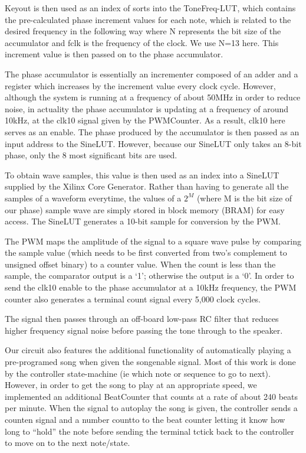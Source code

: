 \documentclass{article}
\begin{document}
    Key\textunderscore out is then used as an index of sorts into the ToneFreq-LUT, which contains the pre-calculated phase increment values for each note, which is related to the desired frequency in the following way
    where N represents the bit size of the accumulator and fclk is the frequency of the clock. We use N=13 here. This increment value is then passed on to the phase accumulator.

    The phase accumulator is essentially an incrementer composed of an adder and a register which increases by the increment value every clock cycle. However, although the system is running at a frequency of about 50MHz in order to reduce noise, in actuality the phase accumulator is updating at a frequency of around 10kHz, at the clk10 signal given by the PWMCounter. As a result, clk10 here serves as an enable. The phase produced by the accumulator is then passed as an input address to the SineLUT. However, because our SineLUT only takes an 8-bit phase, only the 8 most significant bits are used.

    To obtain wave samples, this value is then used as an index into a SineLUT supplied by the Xilinx Core Generator. Rather than having to generate all the samples of a waveform everytime, the values of a $2^M$ (where M is the bit size of our phase) sample wave are simply stored in block memory (BRAM) for easy access. The SineLUT generates a 10-bit sample for conversion by the PWM.

    The PWM maps the amplitude of the signal to a square wave pulse by comparing the sample value (which needs to be first converted from two's complement to unsigned offset binary) to a counter value. When the count is less than the sample, the comparator output is a `1'; otherwise the output is a `0'. In order to send the clk10 enable to the phase accumulator at a 10kHz frequency, the PWM counter also generates a terminal count signal every 5,000 clock cycles. 

    The signal then passes through an off-board low-pass RC filter that reduces higher frequency signal noise before passing the tone through to the speaker.

    Our circuit also features the additional functionality of automatically playing a pre-programed song when given the song\textunderscore enable signal. Most of this work is done by the controller state-machine (ie which note or sequence to go to next). However, in order to get the song to play at an appropriate speed, we implemented an additional BeatCounter that counts at a rate of about 240 beats per minute. When the signal to autoplay the song is given, the controller sends a count\textunderscore en signal and a number count\textunderscore to to the beat counter letting it know how long to ``hold'' the note before sending the terminal tc\textunderscore tick back to the controller to move on to the next note/state.
\end{document}
